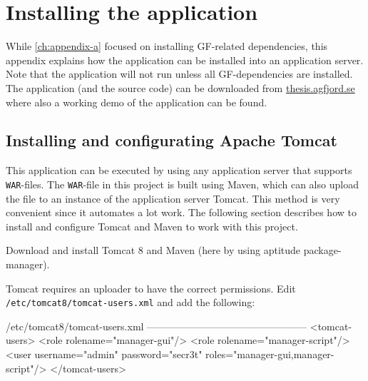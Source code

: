 \chapter{Installing the application}\label{ch:appendix-b}

While \autoref{ch:appendix-a} focused on installing GF-related dependencies, this appendix explains how the application can be installed into an application server. Note that the application will not run unless all GF-dependencies are installed. The application (and the source code) can be downloaded from \href{http://thesis.agfjord.se/}{thesis.agfjord.se} where also a working demo of the application can be found.

\section{Installing and configurating Apache Tomcat}
This application can be executed by using any application server that supports \texttt{WAR}-files. The \texttt{WAR}-file in this project is built using Maven, which can also upload the file to an instance of the application server Tomcat. This method is very convenient since it automates a lot work. The following section describes how to install and configure Tomcat and Maven to work with this project.

Download and install Tomcat 8 and Maven (here by using aptitude package-manager).


Tomcat requires an uploader to have the correct permissions.
\newline
Edit \texttt{/etc/tomcat8/tomcat-users.xml} and add the following:

\begin{terminal}
/etc/tomcat8/tomcat-users.xml
------------------------------------------------
<tomcat-users>
  <role rolename="manager-gui"/>
  <role rolename="manager-script"/>
  <user username="admin" password="secr3t" roles="manager-gui,manager-script"/>
</tomcat-users>
\end{terminal}

